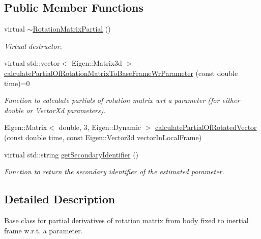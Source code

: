 \subsection*{Public Member Functions}
\begin{DoxyCompactItemize}
\item 
virtual \hyperlink{classtudat_1_1observation__partials_1_1RotationMatrixPartial_a74a1aafeff8ba51c4020aef18ec4d42b}{$\sim$\+Rotation\+Matrix\+Partial} ()\hypertarget{classtudat_1_1observation__partials_1_1RotationMatrixPartial_a74a1aafeff8ba51c4020aef18ec4d42b}{}\label{classtudat_1_1observation__partials_1_1RotationMatrixPartial_a74a1aafeff8ba51c4020aef18ec4d42b}

\begin{DoxyCompactList}\small\item\em Virtual destructor. \end{DoxyCompactList}\item 
virtual std\+::vector$<$ Eigen\+::\+Matrix3d $>$ \hyperlink{classtudat_1_1observation__partials_1_1RotationMatrixPartial_a758db711ec18f3efbaa759488e45daf1}{calculate\+Partial\+Of\+Rotation\+Matrix\+To\+Base\+Frame\+Wr\+Parameter} (const double time)=0
\begin{DoxyCompactList}\small\item\em Function to calculate partials of rotation matrix wrt a parameter (for either double or Vector\+Xd parameters). \end{DoxyCompactList}\item 
Eigen\+::\+Matrix$<$ double, 3, Eigen\+::\+Dynamic $>$ \hyperlink{classtudat_1_1observation__partials_1_1RotationMatrixPartial_a5c50ff0ee090a53772000357cf2855c4}{calculate\+Partial\+Of\+Rotated\+Vector} (const double time, const Eigen\+::\+Vector3d vector\+In\+Local\+Frame)
\item 
virtual std\+::string \hyperlink{classtudat_1_1observation__partials_1_1RotationMatrixPartial_a0e55c2d7ab65b053705dcfa3e37048b5}{get\+Secondary\+Identifier} ()
\begin{DoxyCompactList}\small\item\em Function to return the secondary identifier of the estimated parameter. \end{DoxyCompactList}\end{DoxyCompactItemize}


\subsection{Detailed Description}
Base class for partial derivatives of rotation matrix from body fixed to inertial frame w.\+r.\+t. a parameter. 

